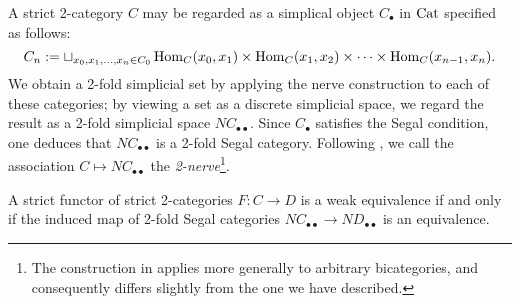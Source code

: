 \documentclass{amsart}
\begin{document}
\begin{example}
	A strict 2-category $C$ may be regarded as a simplical object $C_\bullet$ in $\mathrm{Cat}$ specified as follows:
	\begin{equation*}
		C_n := \sqcup_{x_0, x_1, \dots, x_n \in C_0} \operatorname{Hom}_C(x_0, x_1) \times \operatorname{Hom}_C(x_1, x_2) \times \cdots \times \operatorname{Hom}_C(x_{n-1}, x_n).
	\end{equation*}
	We obtain a 2-fold simplicial set by applying the nerve construction to each of these categories; by viewing a set as a discrete simplicial space, we regard the result as a 2-fold simplicial space $NC_{\bullet \bullet}$. Since $C_\bullet$ satisfies the Segal condition, one deduces that $NC_{\bullet \bullet}$ is a 2-fold Segal category. 
Following \cite{MR2366560}, we call the association $C \mapsto NC_{\bullet \bullet}$ the {\em 2-nerve}\footnote{The construction in \cite{MR2366560} applies more generally to arbitrary bicategories, and consequently differs slightly from the one we have described.}.  
\end{example}

\begin{lemma}[\cite{MR2366560}] \label{lma:2catnervereflectsequiv}
	A strict functor of strict 2-categories $F: C \to D$ is a weak equivalence if and only if the induced map of 2-fold Segal categories $NC_{\bullet \bullet} \to ND_{\bullet \bullet}$ is an equivalence. 
\end{lemma}
\end{document}
